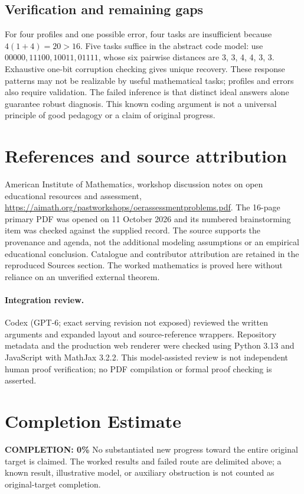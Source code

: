 \documentclass[11pt]{article}
\begin{document}
\subsection{Verification and remaining gaps}
For four profiles and one possible error, four tasks are insufficient because $4(1+4)=20>16$. Five tasks suffice in the abstract code model: use $00000,11100,10011,01111$, whose six pairwise distances are 3, 3, 4, 4, 3, 3. Exhaustive one-bit corruption checking gives unique recovery. These response patterns may not be realizable by useful mathematical tasks; profiles and errors also require validation. The failed inference is that distinct ideal answers alone guarantee robust diagnosis. This known coding argument is not a universal principle of good pedagogy or a claim of original progress.

\section{References and source attribution}
American Institute of Mathematics, workshop discussion notes on open educational resources and assessment, \url{https://aimath.org/pastworkshops/oerassessmentproblems.pdf}. The 16-page primary PDF was opened on 11 October 2026 and its numbered brainstorming item was checked against the supplied record. The source supports the provenance and agenda, not the additional modeling assumptions or an empirical educational conclusion. Catalogue and contributor attribution are retained in the reproduced Sources section. The worked mathematics is proved here without reliance on an unverified external theorem.


\paragraph{Integration review.} Codex (GPT-6; exact serving revision not exposed) reviewed the written arguments and expanded layout and source-reference wrappers. Repository metadata and the production web renderer were checked using Python 3.13 and JavaScript with MathJax 3.2.2. This model-assisted review is not independent human proof verification; no PDF compilation or formal proof checking is asserted.

\section{Completion Estimate}
\noindent\textbf{COMPLETION: 0\%}
No substantiated new progress toward the entire original target is claimed. The worked results and failed route are delimited above; a known result, illustrative model, or auxiliary obstruction is not counted as original-target completion.
\end{document}
